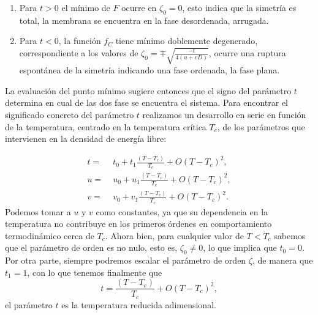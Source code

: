 \begin{enumerate}
\item Para $t>0$ el mínimo de $F$ ocurre en $\zeta_0=0$, esto indica que la
  simetría es total, la membrana se encuentra en la fase desordenada,
  arrugada.
\item Para $t<0$, la función $f_C$ tiene mínimo doblemente
  degenerado, correspondiente a los valores de $\zeta_0=\mp
  \sqrt{\frac{-t}{4(u+vD)}}$, ocurre una ruptura espontánea de la simetría
  indicando una fase ordenada, la fase plana.
\end{enumerate}

La evaluación del punto mínimo sugiere entonces que el
signo del parámetro $t$ determina en cual de las dos fase se encuentra el
sistema. Para encontrar el significado concreto del parámetro $t$
realizamos un desarrollo en serie en función de la temperatura, centrado en la
temperatura crítica $T_c$, de los parámetros que intervienen en la densidad
de energía libre:

\begin{align*}
t=&\; t_0+t_1\frac{(T-T_c)}{T_c}+O(T-T_c)^2,\\
u=&\; u_0+u_1\frac{(T-T_c)}{T_c}+O(T-T_c)^2,\\
v=&\; v_0+v_1\frac{(T-T_c)}{T_c}+O(T-T_c)^2.
\end{align*}
Podemos tomar a $u$ y $v$ como constantes, ya que su dependencia en la 
temperatura no contribuye en los primeros órdenes en comportamiento
termodinámico cerca de $T_c$. Ahora bien,
para cualquier valor de $T\!<\!T_c$ sabemos que el parámetro de orden es no
nulo, esto es, $\zeta_0\!\neq\! 0$, lo que implica que $t_0=0$. Por otra
parte, siempre podremos escalar el parámetro de orden 
$\zeta$, de manera que $t_1=1$, con lo que tenemos finalmente que
\begin{equation*}
t=\frac{(T-T_c)}{T_c}+O(T-T_c)^2,
\end{equation*}
el parámetro $t$ es la temperatura reducida adimensional.


 
